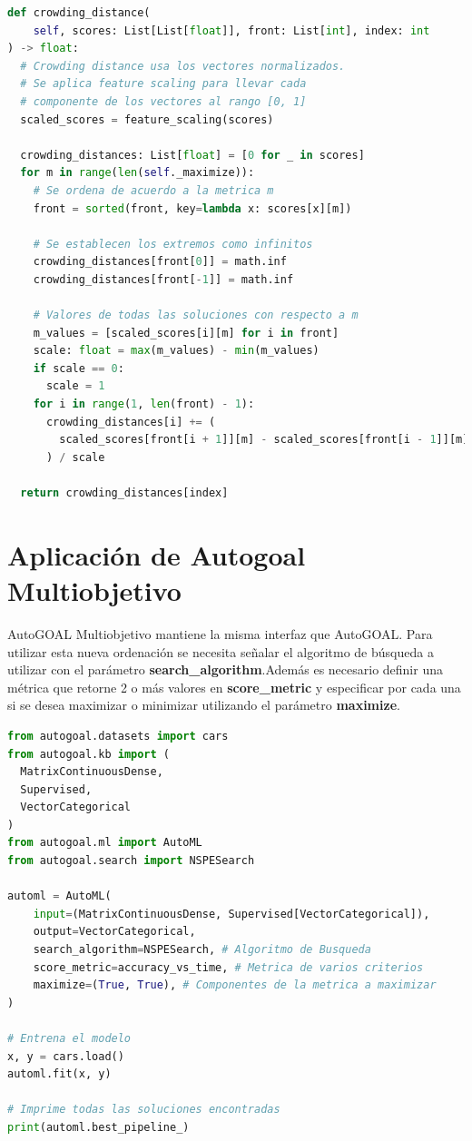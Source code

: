 \begin{lstlisting}[caption=Crowding Distance Sorting, language=Python]
def crowding_distance(
    self, scores: List[List[float]], front: List[int], index: int
) -> float:
  # Crowding distance usa los vectores normalizados.
  # Se aplica feature scaling para llevar cada
  # componente de los vectores al rango [0, 1]
  scaled_scores = feature_scaling(scores)

  crowding_distances: List[float] = [0 for _ in scores]
  for m in range(len(self._maximize)):
    # Se ordena de acuerdo a la metrica m
    front = sorted(front, key=lambda x: scores[x][m])

    # Se establecen los extremos como infinitos
    crowding_distances[front[0]] = math.inf
    crowding_distances[front[-1]] = math.inf

    # Valores de todas las soluciones con respecto a m 
    m_values = [scaled_scores[i][m] for i in front]
    scale: float = max(m_values) - min(m_values)
    if scale == 0:
      scale = 1
    for i in range(1, len(front) - 1):
      crowding_distances[i] += (
        scaled_scores[front[i + 1]][m] - scaled_scores[front[i - 1]][m]
      ) / scale

  return crowding_distances[index]
\end{lstlisting}

\section{Aplicaci\'on de Autogoal Multiobjetivo}
AutoGOAL Multiobjetivo mantiene la misma interfaz que AutoGOAL. Para utilizar esta nueva ordenaci\'on se necesita  se\~nalar el algoritmo de b\'usqueda a utilizar con el par\'ametro \textbf{search\_algorithm}.Adem\'as es necesario definir una m\'etrica que retorne 2 o m\'as valores en \textbf{score\_metric} y especificar por cada una si se desea maximizar o minimizar utilizando el par\'ametro  \textbf{maximize}. 

\begin{lstlisting}[caption=Utilizando NPSGE, language=Python]
from autogoal.datasets import cars
from autogoal.kb import (
  MatrixContinuousDense,
  Supervised,
  VectorCategorical
)
from autogoal.ml import AutoML
from autogoal.search import NSPESearch

automl = AutoML(
    input=(MatrixContinuousDense, Supervised[VectorCategorical]),
    output=VectorCategorical,
    search_algorithm=NSPESearch, # Algoritmo de Busqueda
    score_metric=accuracy_vs_time, # Metrica de varios criterios
    maximize=(True, True), # Componentes de la metrica a maximizar
)

# Entrena el modelo
x, y = cars.load()
automl.fit(x, y)

# Imprime todas las soluciones encontradas
print(automl.best_pipeline_) 
\end{lstlisting}

